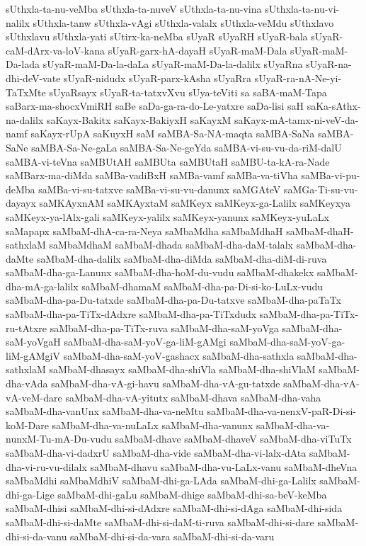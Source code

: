 {sUthxla-ta-nu-veMba
sUthxla-ta-nuveV
sUthxla-ta-nu-vina
sUthxla-ta-nu-vi-nalilx
sUthxla-tanw
sUthxla-vAgi
sUthxla-valalx
sUthxla-veMdu
sUthxlavo
sUthxlavu
sUthxla-yati
sUtirx-ka-neMba
sUyaR
sUyaRH
sUyaR-bala
sUyaR-caM-dArx-va-loV-kana
sUyaR-garx-hA-dayaH
sUyaR-maM-Dala
sUyaR-maM-Da-lada
sUyaR-maM-Da-la-daLa
sUyaR-maM-Da-la-dalilx
sUyaRna
sUyaR-na-dhi-deV-vate
sUyaR-nidudx
sUyaR-parx-kAsha
sUyaRra
sUyaR-ra-nA-Ne-yi-TaTxMte
sUyaRsayx
sUyaR-ta-tatxvXvu
sUya-teViti
sa
saBA-maM-Tapa
saBarx-ma-shocxVmiRH
saBe
saDa-ga-ra-do-Le-yatxre
saDa-lisi
saH
saKa-sAthx-na-dalilx
saKayx-Bakitx
saKayx-BakiyxH
saKayxM
saKayx-mA-tamx-ni-veV-da-namf
saKayx-rUpA
saKuyxH
saM
saMBA-Sa-NA-maqta
saMBA-SaNa
saMBA-SaNe
saMBA-Sa-Ne-gaLa
saMBA-Sa-Ne-geYda
saMBA-vi-su-vu-da-riM-dalU
saMBA-vi-teVna
saMBUtAH
saMBUta
saMBUtaH
saMBU-ta-kA-ra-Nade
saMBarx-ma-diMda
saMBa-vadiBxH
saMBa-vamf
saMBa-va-tiVha
saMBa-vi-pu-deMba
saMBa-vi-su-tatxve
saMBa-vi-su-vu-danunx
saMGAteV
saMGa-Ti-su-vu-dayayx
saMKAyxnAM
saMKAyxtaM
saMKeyx
saMKeyx-ga-Lalilx
saMKeyxya
saMKeyx-ya-lAlx-gali
saMKeyx-yalilx
saMKeyx-yanunx
saMKeyx-yuLaLx
saMapapx
saMbaM-dhA-ca-ra-Neya
saMbaMdha
saMbaMdhaH
saMbaM-dhaH-sathxlaM
saMbaMdhaM
saMbaM-dhada
saMbaM-dha-daM-talalx
saMbaM-dha-daMte
saMbaM-dha-dalilx
saMbaM-dha-diMda
saMbaM-dha-diM-di-ruva
saMbaM-dha-ga-Lanunx
saMbaM-dha-hoM-du-vudu
saMbaM-dhakekx
saMbaM-dha-mA-ga-lalilx
saMbaM-dhamaM
saMbaM-dha-pa-Di-si-ko-LuLx-vudu
saMbaM-dha-pa-Du-tatxde
saMbaM-dha-pa-Du-tatxve
saMbaM-dha-paTaTx
saMbaM-dha-pa-TiTx-dAdxre
saMbaM-dha-pa-TiTxdudx
saMbaM-dha-pa-TiTx-ru-tAtxre
saMbaM-dha-pa-TiTx-ruva
saMbaM-dha-saM-yoVga
saMbaM-dha-saM-yoVgaH
saMbaM-dha-saM-yoV-ga-liM-gAMgi
saMbaM-dha-saM-yoV-ga-liM-gAMgiV
saMbaM-dha-saM-yoV-gashacx
saMbaM-dha-sathxla
saMbaM-dha-sathxlaM
saMbaM-dhasayx
saMbaM-dha-shiVla
saMbaM-dha-shiVlaM
saMbaM-dha-vAda
saMbaM-dha-vA-gi-havu
saMbaM-dha-vA-gu-tatxde
saMbaM-dha-vA-vA-veM-dare
saMbaM-dha-vA-yitutx
saMbaM-dhava
saMbaM-dha-vaha
saMbaM-dha-vanUnx
saMbaM-dha-va-neMtu
saMbaM-dha-va-nenxV-paR-Di-si-koM-Dare
saMbaM-dha-va-nuLaLx
saMbaM-dha-vanunx
saMbaM-dha-va-nunxM-Tu-mA-Du-vudu
saMbaM-dhave
saMbaM-dhaveV
saMbaM-dha-viTuTx
saMbaM-dha-vi-dadxrU
saMbaM-dha-vide
saMbaM-dha-vi-lalx-dAta
saMbaM-dha-vi-ru-vu-dilalx
saMbaM-dhavu
saMbaM-dha-vu-LaLx-vanu
saMbaM-dheVna
saMbaMdhi
saMbaMdhiV
saMbaM-dhi-ga-LAda
saMbaM-dhi-ga-Lalilx
saMbaM-dhi-ga-Lige
saMbaM-dhi-gaLu
saMbaM-dhige
saMbaM-dhi-sa-beV-keMba
saMbaM-dhisi
saMbaM-dhi-si-dAdxre
saMbaM-dhi-si-dAga
saMbaM-dhi-sida
saMbaM-dhi-si-daMte
saMbaM-dhi-si-daM-ti-ruva
saMbaM-dhi-si-dare
saMbaM-dhi-si-da-vanu
saMbaM-dhi-si-da-vara
saMbaM-dhi-si-da-varu
}
